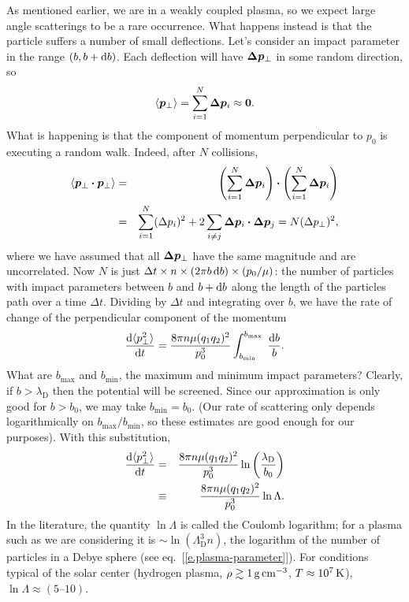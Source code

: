 As mentioned earlier, we are in a weakly coupled plasma, so we expect large angle scatterings to be a rare occurrence. What happens instead is that the particle suffers a number of small deflections. Let's consider an impact parameter in the range $(b,b+\mathrm{d} b)$. Each deflection will have $\boldsymbol{\Delta p}_{\bot}$ in some random direction, so
\[ \langle \boldsymbol{ p}_{\bot}\rangle = \sum_{i=1}^{N} \boldsymbol{\Delta p}_{i} \approx \boldsymbol{0}. \]
What is happening is that the component of momentum perpendicular to $p_{0}$ is executing a random walk.  Indeed, after $N$ collisions,
\begin{eqnarray*} \langle \boldsymbol{p}_{\bot} \boldsymbol{\cdot} \boldsymbol{p}_{\bot} \rangle  &=& \left( \sum_{i=1}^{N} \boldsymbol{\Delta p}_{i}\right)\boldsymbol{\cdot} \left( \sum_{i=1}^{N} \boldsymbol{\Delta p}_{i} \right) \\
&=& \sum_{i=1}^{N} (\Delta p_{i})^{2} + 2\sum_{i\ne j} \boldsymbol{\Delta p}_{i}\boldsymbol{\cdot}\boldsymbol{\Delta p}_{j} = N(\Delta p_{\bot})^{2},
\end{eqnarray*}
where we have assumed that all $\boldsymbol{\Delta p}_{\perp}$ have the same magnitude and are uncorrelated. Now $N$ is just $\Delta t \times n \times (2\pi b \,\mathrm{d} b) \times (p_{0}/\mu)$: the number of particles with impact parameters between $b$ and $b+\mathrm{d} b$ along the length of the particles path over a time $\Delta t$.  Dividing by $\Delta t$ and integrating over $b$, we have the rate of change of the perpendicular component of the momentum
\begin{equation}\label{e.msdev-momentum}
\frac{\mathrm{d} \langle p_{\bot}^{2}\rangle }{\mathrm{d} t} = \frac{8\pi n\mu (q_{1}q_{2})^{2}}{p_{0}^{3}}\int_{b_{\mathrm{min}}}^{b_{\mathrm{max}}}\;\frac{\mathrm{d} b}{b}.
\end{equation}
What are $b_{\mathrm{max}}$ and $b_{\mathrm{min}}$, the maximum and minimum impact parameters? Clearly, if $b > \lambda_{\mathrm{D}}$ then the potential will be screened.  Since our approximation is only good for $b > b_{0}$, we may take $b_{\mathrm{min}} = b_{0}$. (Our rate of scattering only depends logarithmically on $b_{\mathrm{max}}/b_{\mathrm{min}}$, so these estimates are good enough for our purposes).  With this substitution,
\begin{eqnarray}
\frac{\mathrm{d} \langle p_{\bot}^{2}\rangle }{\mathrm{d} t} &=& \frac{8\pi n\mu (q_{1}q_{2})^{2}}{p_{0}^{3}}\ln\left(\frac{\lambda_{\mathrm{D}}}{b_{0}}\right)\nonumber \\
 &\equiv& \frac{8\pi n\mu (q_{1}q_{2})^{2}}{p_{0}^{3}}\ln\Lambda.
\label{e.deflection-rate}
\end{eqnarray}
In the literature, the quantity $\ln\Lambda$ is called the Coulomb logarithm; for a plasma such as we are considering it is $\sim \ln  \left(\Lambda_{\mathrm{D}}^{3} n\right)$, the logarithm of the number of particles in a Debye sphere (see eq.~[\ref{e.plasma-parameter}]).  For conditions typical of the solar center (hydrogen plasma, $\rho \gtrsim 1\,\mathrm{g}\,{\mathrm{c}\mathrm{m}}^{-3}$, $T \approx 10^{7}\,\mathrm{K}$), $\ln\Lambda \approx \left(5\textrm{--}10\right)$.  

